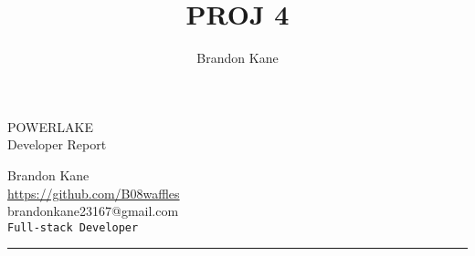 \documentclass[11pt,letterpaper]{report}
\title{PROJ 4}
\author{Brandon Kane}
\begin{document}
\begin{titlepage} %

	
\colorbox{draculacl}{
\parbox[t]{0.93\textwidth}{ %
	\parbox[t]{0.91\textwidth}{ %
		\raggedleft %
		\fontsize{50pt}{80pt}\selectfont %
		\vspace{0.7cm} %
		POWERLAKE\\
			
		Developer Report\\
				
					
		\vspace{0.7cm} %
		}
	}
}
		
		
\vfill %
		
		
\parbox[t]{0.93\textwidth}{ %
	\raggedleft %

\large %
	{\Large Brandon Kane}\\[4pt] %
	\href{https://github.com/B08waffles/}{https://github.com/B08waffles}\\
	brandonkane23167@gmail.com\\[4pt] %
	\texttt{Full-stack Developer}\\
			
	\hfill\rule{0.2\linewidth}{1pt}%
}
		
\end{titlepage}
\newpage
\tableofcontents{}
\newpage
\end{document}
